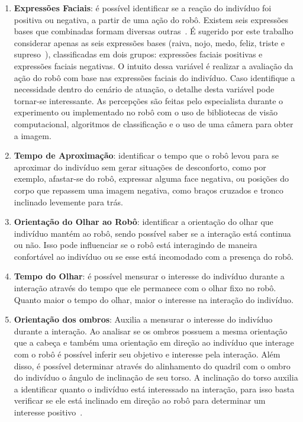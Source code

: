 \begin{enumerate}
    \item \textbf{Expressões Faciais}: é possível identificar se a reação do indivíduo foi positiva ou negativa, a partir de uma ação do robô. Existem seis expressões bases que combinadas formam diversas outras~\cite{bihan:2014}. É sugerido por este trabalho considerar apenas as seis expressões bases (raiva, nojo, medo, feliz, triste e supreso~\cite{kaitai:2011}), classificadas em dois grupos: expressões faciais positivas e expressões faciais negativas. O intuito dessa variável é realizar a avaliação da ação do robô com base nas expressões faciais do indivíduo. Caso identifique a necessidade dentro do cenário de atuação, o detalhe desta variável pode tornar-se interessante. As percepções são feitas pelo especialista durante o experimento ou implementado no robô com o uso de bibliotecas de visão computacional, algoritmos de classificação e o uso de uma câmera para obter a imagem.
    \item \textbf{Tempo de Aproximação}: identificar o tempo que o robô levou para se aproximar do indivíduo sem gerar situações de desconforto, como por exemplo, afastar-se do robô, expressar alguma face negativa, ou posições do corpo que repassem uma imagem negativa, como braços cruzados e tronco inclinado levemente para trás.
    \item \textbf{Orientação do Olhar ao Robô}: identificar a orientação do olhar que indivíduo mantém ao robô, sendo possível saber se a interação está continua ou não. Isso pode influenciar se o robô está interagindo de maneira confortável ao indivíduo ou se esse está incomodado com a presença do robô.
    \item \textbf{Tempo do Olhar}: é possível mensurar o interesse do indivíduo durante a interação através do tempo que ele permanece com o olhar fixo no robô. Quanto maior o tempo do olhar, maior o interesse na interação do indivíduo.
    \item \textbf{Orientação dos ombros}: Auxilia a mensurar o interesse do indivíduo durante a interação. Ao analisar se os ombros possuem a mesma orientação que a cabeça e também uma orientação em direção ao indivíduo que interage com o robô é possível inferir seu objetivo e interesse pela interação. Além disso, é possível determinar através do alinhamento do quadril com o ombro do indivíduo o ângulo de inclinação de seu torso. A inclinação do torso auxilia a identificar quanto o indivíduo está interessado na interação, para isso basta verificar se ele está inclinado em direção ao robô para determinar um interesse positivo~\cite{lambert:2008}.

\end{enumerate}
